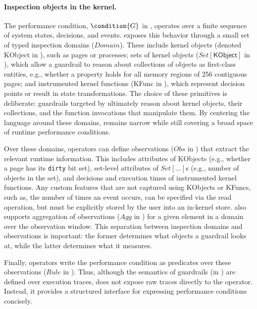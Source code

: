\paragraph{Inspection objects in the kernel.}
The performance condition, $\condition{G}$ in , operates over a finite sequence of system states, decisions, and events.
\lang exposes this behavior through a small set of typed inspection domains ($Domain$).
These include kernel objects (denoted \textsf{KObject} in ), such as pages or processes; sets of kernel objects ($Set[\textsf{KObject}]$ in ), which allow a guardrail to reason about collections of objects as first-class entities, e.g., whether a property holds for all memory regions of 256 contiguous pages; and instrumented kernel functions (\textsf{KFunc} in ), which represent decision points or result in state transformations.
The choice of these primitives is deliberate: guardrails targeted by \lang ultimately reason about kernel objects, their collections, and the function invocations that manipulate them. By centering the language around these domains, \lang remains narrow while still covering a broad space of runtime performance conditions.

Over these domains, operators can define observations ($Obs$ in ) that extract the relevant runtime information.
This includes attributes of \textsf{KObject}s (e.g., whether a page has its {\tt dirty} bit set), set-level attributes of $Set[...]$s (e.g., number of objects in the set), and decisions and execution times of instrumented kernel functions.
Any custom features that are not captured using \textsf{KObject}s or \textsf{KFunc}s, such as, the number of times an event occurs, can be specified via the \textsf{read} operation, but must be explicitly stored by the user into an in-kernel store. 
\lang also supports aggregation of observations ($Agg$ in ) for a given element in a domain over the observation window.
This separation between inspection domains and observations is important: the former determines what objects a guardrail looks at, while the latter determines what it measures.

Finally, operators write the performance condition as predicates over these observations ($Rule$ in ).
Thus, although the semantics of guardrails (in ) are defined over execution traces, \lang does not expose raw traces directly to the operator.
Instead, it provides a structured interface for expressing performance conditions concisely.

